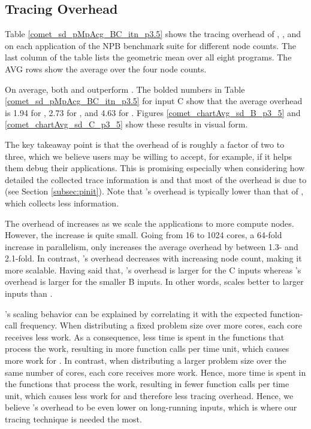 
\subsection{Tracing Overhead}
\label{subsec:lowtoh}

Table \ref{comet_sd_pMpAcg_BC_itn_p3.5} shows the tracing overhead of \parlotm, \parlota, and \callgrind on each application of the NPB benchmark suite for different node counts. The last column of the table lists the geometric mean over all eight programs. The AVG rows show the average over the four node counts.


On average, both \parlotm and \parlota outperform \callgrind. The bolded numbers in Table \ref{comet_sd_pMpAcg_BC_itn_p3.5} for input C show that the average overhead is 1.94 for \parlotm, 2.73 for \parlota, and 4.63 for \callgrind. Figures \ref{comet_chartAvg_sd_B_p3_5} and \ref{comet_chartAvg_sd_C_p3_5} show these results in visual form.


The key takeaway point is that the overhead of \parlot is roughly a factor of two to three, which we believe users may be willing to accept, for example, if it helps them debug their applications. This is promising especially when considering how detailed the collected trace information is and that most of the overhead is due to \pin (see Section \ref{subsec:pinit}). Note that \parlot 's overhead is typically lower than that of \callgrind, which collects less information.

The overhead of \parlot increases as we scale the applications to more compute nodes. However, the increase is quite small. Going from 16 to 1024 cores, a 64-fold increase in parallelism, only increases the average overhead by between 1.3- and 2.1-fold. In contrast, \callgrind's overhead decreases with increasing node count, making it more scalable. Having said that, \callgrind's overhead is larger for the C inputs whereas \parlot 's overhead is larger for the smaller B inputs. In other words, \parlot scales better to larger inputs than \callgrind.

\parlot's scaling behavior can be explained by correlating it with the expected function-call frequency. When distributing a fixed problem size over more cores, each core receives less work. As a consequence, less time is spent in the functions that process the work, resulting in more function calls per time unit, which causes more work for \parlot. In contrast, when distributing a larger problem size over the same number of cores, each core receives more work. Hence, more time is spent in the functions that process the work, resulting in fewer function calls per time unit, which causes less work for \parlot and therefore less tracing overhead. Hence, we believe \parlot 's overhead to be even lower on long-running inputs, which is where our tracing technique is needed the most.


